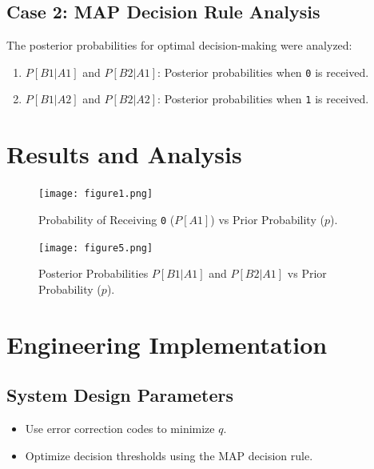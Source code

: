 \documentclass[a4paper,11pt]{article}
\begin{document}
\subsection{Case 2: MAP Decision Rule Analysis}
The posterior probabilities for optimal decision-making were analyzed:
\begin{enumerate}
    \item $P[B1|A1]$ and $P[B2|A1]$: Posterior probabilities when \texttt{0} is received.
    \item $P[B1|A2]$ and $P[B2|A2]$: Posterior probabilities when \texttt{1} is received.
\end{enumerate}

 
\section{Results and Analysis}

\begin{figure}[H]
    \centering
    \begin{minipage}[t]{0.48\textwidth}
        \centering
        \texttt{[image: figure1.png]} %
        \caption{Probability of Receiving \texttt{0} ($P[A1]$) vs Prior Probability ($p$).}
        \label{fig:PA1_p}
    \end{minipage}%
    \hfill
    \begin{minipage}[t]{0.48\textwidth}
        \centering
        \texttt{[image: figure5.png]} %
        \caption{Posterior Probabilities $P[B1|A1]$ and $P[B2|A1]$ vs Prior Probability ($p$).}
        \label{fig:PB1A1_p}
    \end{minipage}
\end{figure}

\section{Engineering Implementation}
\subsection{System Design Parameters}
\begin{itemize}
    \item Use error correction codes to minimize $q$.
    \item Optimize decision thresholds using the MAP decision rule.
\end{itemize}
\end{document}
